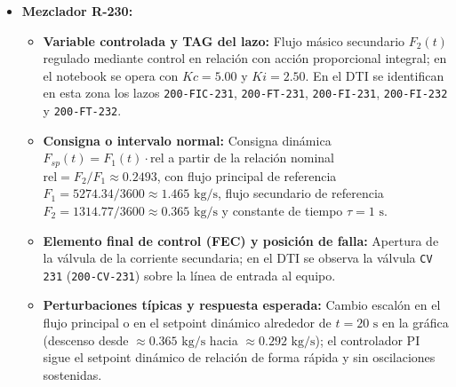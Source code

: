 \documentclass[11pt,letterpaper]{article}
\begin{document}
\begin{itemize}
    \item \textbf{Mezclador R-230:}
\begin{itemize}
    \item \textbf{Variable controlada y TAG del lazo:} Flujo másico secundario $F_2(t)$ regulado mediante control en relación con acción proporcional integral; en el notebook se opera con $Kc = 5.00$ y $Ki = 2.50$. En el DTI se identifican en esta zona los lazos \texttt{200-FIC-231}, \texttt{200-FT-231}, \texttt{200-FI-231}, \texttt{200-FI-232} y \texttt{200-FT-232}.
    \item \textbf{Consigna o intervalo normal:} Consigna dinámica $F_{sp}(t) = F_1(t) \cdot \text{rel}$ a partir de la relación nominal $\text{rel} = F_2/F_1 \approx 0.2493$, con flujo principal de referencia $F_1 = 5274.34/3600 \approx 1.465\text{ kg/s}$, flujo secundario de referencia $F_2 = 1314.77/3600 \approx 0.365\text{ kg/s}$ y constante de tiempo $\tau = 1\text{ s}$.
    \item \textbf{Elemento final de control (FEC) y posición de falla:} Apertura de la válvula de la corriente secundaria; en el DTI se observa la válvula \texttt{CV 231} (\texttt{200-CV-231}) sobre la línea de entrada al equipo.
    \item \textbf{Perturbaciones típicas y respuesta esperada:} Cambio escalón en el flujo principal o en el setpoint dinámico alrededor de $t = 20\text{ s}$ en la gráfica (descenso desde $\approx 0.365\text{ kg/s}$ hacia $\approx 0.292\text{ kg/s}$); el controlador PI sigue el setpoint dinámico de relación de forma rápida y sin oscilaciones sostenidas.
\end{itemize}


\end{itemize}
\end{document}
